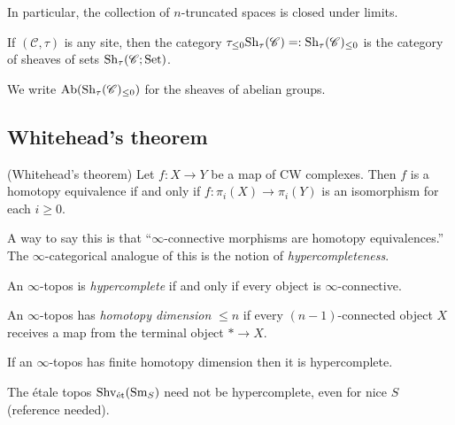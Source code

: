 \documentclass[11pt,openany]{book}
\begin{document}
\noindent In particular, the collection of $n$-truncated spaces is closed under limits.

\begin{definition} If $(\mathscr{C},\tau)$ is any site, then the category $\tau_{\le 0}\mathrm{Sh}_\tau(\mathscr{C}) =: \mathrm{Sh}_\tau(\mathscr{C}) _{\le 0}$ is the category of sheaves of sets $\mathrm{Sh}_\tau(\mathscr{C};\mathrm{Set})$.
\end{definition}

\begin{notation} We write $\mathrm{Ab}(\mathrm{Sh}_\tau(\mathscr{C})_{\le 0})$ for the sheaves of abelian groups.
\end{notation}



\subsection{Whitehead's theorem}

\begin{theorem} (Whitehead's theorem) Let $f \colon X \to Y$ be a map of CW complexes. Then $f$ is a homotopy equivalence if and only if $f \colon \pi_i(X) \to \pi_i(Y)$ is an isomorphism for each $i\ge0$.
\end{theorem}

A way to say this is that ``$\infty$-connective morphisms are homotopy equivalences.'' The $\infty$-categorical analogue of this is the notion of \textit{hypercompleteness}.

\begin{definition} An $\infty$-topos is \textit{hypercomplete} if and only if every object is $\infty$-connective.
\end{definition}

\begin{definition} \cite[7.2.11]{HTT} An $\infty$-topos has \textit{homotopy dimension} $\le n$ if every $(n-1)$-connected object $X$ receives a map from the terminal object $\ast \to X$.
\end{definition}

\begin{theorem} If an $\infty$-topos has finite homotopy dimension then it is hypercomplete.
\end{theorem}

\begin{warning} The \'etale topos $\mathrm{Shv}_{\text{\'{e}t}}(\mathrm{Sm}_S)$ need not be hypercomplete, even for nice $S$ (reference needed).
\end{warning}
\end{document}
